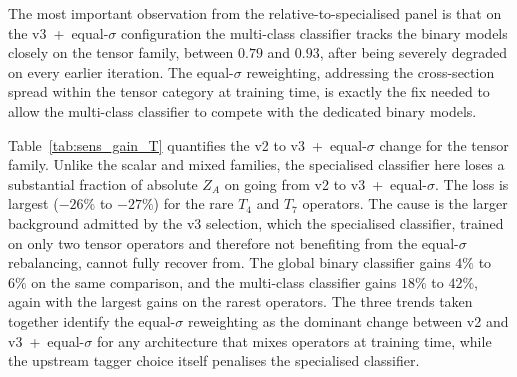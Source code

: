 The most important observation from the relative-to-specialised panel is that on the v3~+~equal-$\sigma$ configuration the multi-class classifier tracks the binary models closely on the tensor family, between $0.79$ and $0.93$, after being severely degraded on every earlier iteration. The equal-$\sigma$ reweighting, addressing the cross-section spread within the tensor category at training time, is exactly the fix needed to allow the multi-class classifier to compete with the dedicated binary models.

Table~\ref{tab:sens_gain_T} quantifies the v2 to v3~+~equal-$\sigma$ change for the tensor family. Unlike the scalar and mixed families, the specialised classifier here loses a substantial fraction of absolute $Z_A$ on going from v2 to v3~+~equal-$\sigma$. The loss is largest ($-26\%$ to $-27\%$) for the rare $T_4$ and $T_7$ operators. The cause is the larger background admitted by the v3 selection, which the specialised classifier, trained on only two tensor operators and therefore not benefiting from the equal-$\sigma$ rebalancing, cannot fully recover from. The global binary classifier gains $4\%$ to $6\%$ on the same comparison, and the multi-class classifier gains $18\%$ to $42\%$, again with the largest gains on the rarest operators. The three trends taken together identify the equal-$\sigma$ reweighting as the dominant change between v2 and v3~+~equal-$\sigma$ for any architecture that mixes operators at training time, while the upstream tagger choice itself penalises the specialised classifier.

